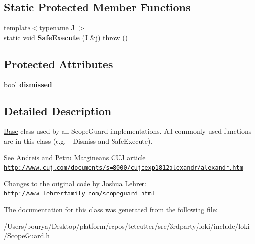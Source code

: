 \subsection*{Static Protected Member Functions}
\begin{DoxyCompactItemize}
\item 
\hypertarget{classLoki_1_1ScopeGuardImplBase_a753544954ef80cd68ea44f2940d9fe59}{}{\footnotesize template$<$typename J $>$ }\\static void {\bfseries Safe\+Execute} (J \&j)  throw ()\label{classLoki_1_1ScopeGuardImplBase_a753544954ef80cd68ea44f2940d9fe59}

\end{DoxyCompactItemize}
\subsection*{Protected Attributes}
\begin{DoxyCompactItemize}
\item 
\hypertarget{classLoki_1_1ScopeGuardImplBase_a31bc2091683558cf0110cfcaea5f4d11}{}bool {\bfseries dismissed\+\_\+}\label{classLoki_1_1ScopeGuardImplBase_a31bc2091683558cf0110cfcaea5f4d11}

\end{DoxyCompactItemize}


\subsection{Detailed Description}
\hyperlink{structBase}{Base} class used by all Scope\+Guard implementations. All commonly used functions are in this class (e.\+g. -\/ Dismiss and Safe\+Execute).

See Andrei\textquotesingle{}s and Petru Marginean\textquotesingle{}s C\+U\+J article \href{http://www.cuj.com/documents/s=8000/cujcexp1812alexandr/alexandr.htm}{\tt http\+://www.\+cuj.\+com/documents/s=8000/cujcexp1812alexandr/alexandr.\+htm}

Changes to the original code by Joshua Lehrer\+: \href{http://www.lehrerfamily.com/scopeguard.html}{\tt http\+://www.\+lehrerfamily.\+com/scopeguard.\+html} 

The documentation for this class was generated from the following file\+:\begin{DoxyCompactItemize}
\item 
/\+Users/pourya/\+Desktop/platform/repos/tetcutter/src/3rdparty/loki/include/loki/Scope\+Guard.\+h\end{DoxyCompactItemize}
